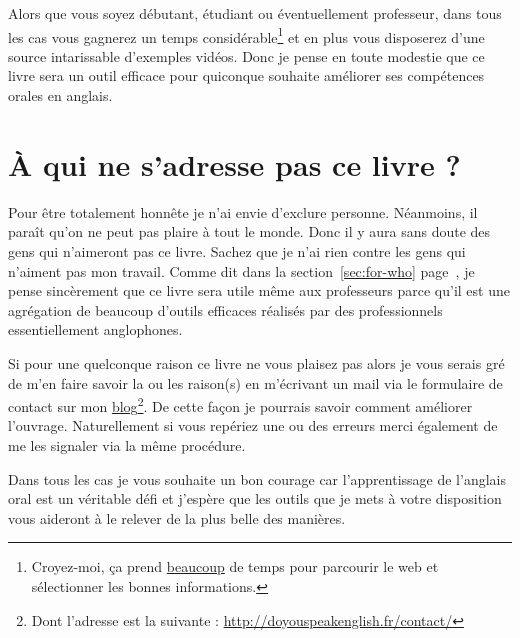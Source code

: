 Alors que vous soyez débutant, étudiant ou éventuellement professeur,
dans tous les cas vous gagnerez un temps
considérable\footnote{Croyez-moi, ça prend \underline{beaucoup} de
temps pour parcourir le web et sélectionner les bonnes informations.}
et en plus vous disposerez d'une source intarissable d'exemples
vidéos. Donc je pense en toute modestie que ce livre sera un outil
efficace pour quiconque souhaite améliorer ses compétences orales en anglais.

\newpage

\section{À qui ne s'adresse pas ce livre ?}\label{sec:for-not-who}

Pour être totalement honnête je n'ai envie d'exclure
personne. Néanmoins, il paraît qu'on ne peut pas plaire à tout le
monde. Donc il y aura sans doute des gens qui n'aimeront pas ce
livre. Sachez que je n'ai rien contre les gens qui n'aiment pas mon
travail. Comme dit dans la section~\ref{sec:for-who}
page~\pageref{sec:for-who}, je pense sincèrement que ce livre sera
utile même aux professeurs parce qu'il est une agrégation de beaucoup
d'outils efficaces réalisés par des professionnels essentiellement
anglophones.

Si pour une quelconque raison ce livre ne vous plaisez pas alors je
vous serais gré de m'en faire savoir la ou les raison(s) en m'écrivant un mail
via le formulaire de contact sur mon \href{http://doyouspeakenglish.fr/contact/}{blog}\footnote{Dont l'adresse est
  la suivante : \url{http://doyouspeakenglish.fr/contact/}}. De cette
façon je pourrais savoir comment améliorer l'ouvrage. Naturellement si
vous repériez une ou des erreurs merci également de me les signaler
via la même procédure.

Dans tous les cas je vous souhaite un bon courage car l'apprentissage
de l'anglais oral est un véritable défi et j'espère que les outils que
je mets à votre disposition vous aideront à le relever de la plus
belle des manières.

\begin{center}
\end{center}

\newpage
\minitoc

